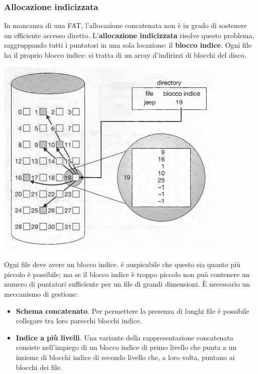 \documentclass[11pt,a4paper]{article}
\begin{document}
{\subsubsection{Allocazione indicizzata}
In mancanza di una FAT, l'allocazione concatenata non è in grado di sostenere un efficiente
accesso diretto. L'\textbf{allocazione indicizzata} risolve questo problema, rag­gruppando tutti i puntatori in una sola locazione: il \textbf{blocco indice}. Ogni file ha il proprio blocco indice: si tratta di un array d'indirizzi di blocchi del di­sco.
\begin{center}
  \includegraphics[scale=0.6]{img/0058.png}
\end{center}
Ogni file deve avere un blocco indice. é auspicabile che questo sia quanto più piccolo è possibile;
ma se il blocco indice è troppo piccolo non può contenere un numero di puntatori suffi­ciente per un file di grandi dimensioni. È necessario un meccanismo di gestione:
\begin{itemize}
  \item \textbf{Schema concatenato}. Per permettere la presenza di lunghi file è possibile collegare tra loro parecchi blocchi indice.
  \item \textbf{Indice a più livelli}. Una variante della rappresentazione concatenata consiste nell'impiego di un blocco indice di primo livello che punta a un insieme di blocchi indice di secondo livello che, a loro volta, puntano ai blocchi dei file.

\end{itemize}}
\end{document}
